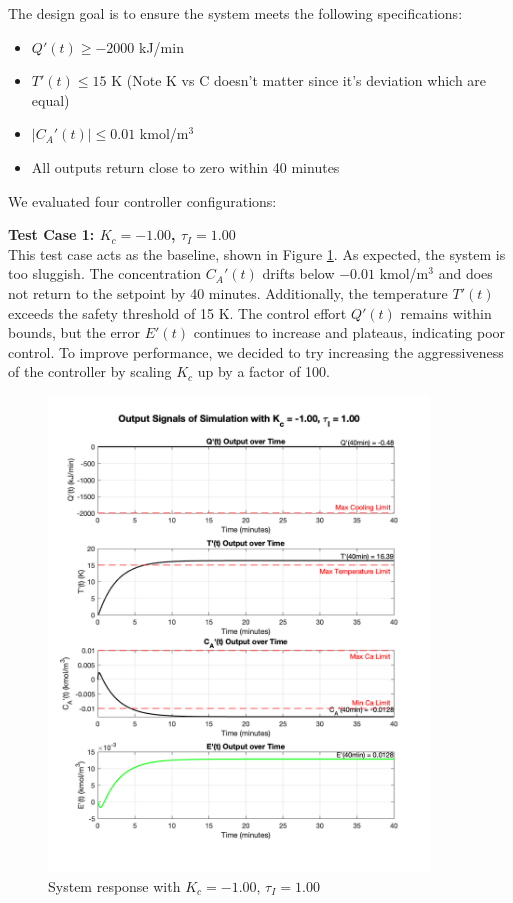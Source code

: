 \documentclass[12pt]{article}
\begin{document}
\begin{enumerate}
\begin{enumerate}
    The design goal is to ensure the system meets the following specifications:
    \begin{itemize}
      \item $Q'(t) \geq -2000$ kJ/min
      \item $T'(t) \leq 15$ K (Note K vs C doesn't matter since it's deviation which are equal)
      \item $|C_A'(t)| \leq 0.01$ kmol/m$^3$
      \item All outputs return close to zero within 40 minutes
    \end{itemize}
    
    We evaluated four controller configurations:
    
    \clearpage
    \textbf{Test Case 1: $K_c = -1.00$, $\tau_I = 1.00$} \\
    This test case acts as the baseline, shown in Figure \ref{fig:figure2_5_testcase1}. As expected, the system is too sluggish. The concentration $C_A'(t)$ drifts below $-0.01$ kmol/m$^3$ and does not return to the setpoint by 40 minutes. Additionally, the temperature $T'(t)$ exceeds the safety threshold of 15 K. The control effort $Q'(t)$ remains within bounds, but the error $E'(t)$ continues to increase and plateaus, indicating poor control. To improve performance, we decided to try increasing the aggressiveness of the controller by scaling $K_c$ up by a factor of 100.
    
    \begin{figure}[H]
      \centering
      \includegraphics[width=0.900\textwidth]{Figures/figure2_5_testcase1.png}
      \caption{System response with $K_c = -1.00$, $\tau_I = 1.00$}
      \label{fig:figure2_5_testcase1}
    \end{figure}
    

\end{enumerate}
\end{enumerate}
\end{document}
